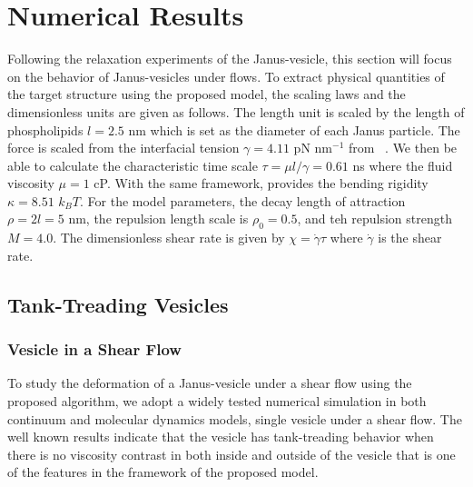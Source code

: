 \documentclass[lineno]{jfm}
\begin{document}


\section{\label{results}Numerical Results}


Following the relaxation experiments of the Janus-vesicle, this section will focus on the behavior of 
Janus-vesicles under flows. To extract physical quantities of the target structure using the proposed model, 
the scaling laws and the dimensionless units are given as follows.
The length unit is scaled by the length of phospholipids $l=2.5$ nm which is set as the diameter of each 
Janus particle. The force is scaled from the interfacial tension $\gamma=4.11$ pN nm$^{-1}$ 
from ~\cite{Ryham16}. We then be able to calculate the characteristic time scale 
$\tau = \mu l/\gamma = 0.61$ ns where the fluid viscosity $\mu=1$ cP. With the same framework, \cite{Fu20} provides the bending rigidity $\kappa=8.51$ $k_BT$.
%
For the model parameters, the decay length of attraction $\rho = 2l = 5$ nm, the repulsion length scale is 
$\rho_0=0.5$, and teh repulsion strength $M=4.0$.
The dimensionless shear rate is given by $\chi = \dot\gamma \tau$ where $\dot\gamma$ is the shear rate.





\subsection{Tank-Treading Vesicles}

\subsubsection{Vesicle in a Shear Flow}

To study the deformation of a Janus-vesicle under a shear flow using the proposed algorithm, 
we adopt a widely tested numerical simulation in both continuum and molecular dynamics models, single vesicle under a shear flow. The well known results indicate that the vesicle has tank-treading behavior when 
there is no viscosity contrast in both inside and outside of the vesicle that is one of the features in the  framework of the proposed model. 
\end{document}

